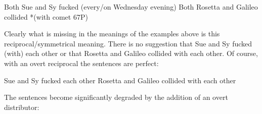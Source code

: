 \documentclass[output=paper]{langsci/langscibook}
\begin{document}
\ea\label{ex:29.19}
    \ea Both Sue and Sy fucked (every/on Wednesday evening)
    \ex Both Rosetta and Galileo collided *(with comet 67P)
    \z
\z

Clearly what is missing in the meanings of the examples above is this
reciprocal/symmetrical meaning. There is no suggestion that Sue and Sy fucked
(with) each other or that Rosetta and Galileo collided with each other. Of
course, with an overt reciprocal the sentences are perfect:

\ea\label{ex:29.20}
    \ea Sue and Sy fucked each other
    \ex Rosetta and Galileo collided with each other
    \z
\z

The sentences become significantly degraded by the addition of an overt distributor:

\ea\label{ex:29.21}
    \z
\z
\end{document}
